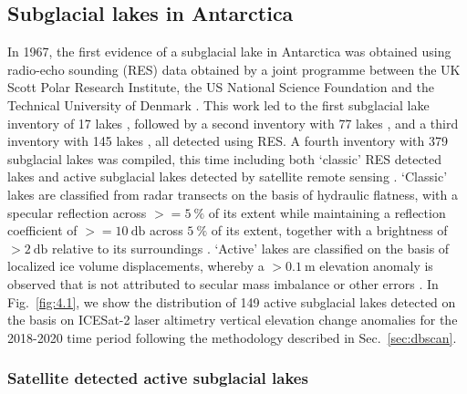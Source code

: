 \subsection{Subglacial lakes in Antarctica}

In 1967, the first evidence of a subglacial lake in Antarctica was obtained using radio-echo sounding (\gls{RES}) data obtained by a joint programme between the UK Scott Polar Research Institute, the US National Science Foundation and the Technical University of Denmark \citep{RobinInterpretationRadioEcho1969}.
This work led to the first subglacial lake inventory of 17 lakes \citep{OswaldLakesAntarcticIce1973}, followed by a second inventory with 77 lakes \citep{SiegertinventoryAntarcticsubglacial1996}, and a third inventory with 145 lakes \citep{SiegertrevisedinventoryAntarctic2005}, all detected using \gls{RES}.
A fourth inventory with 379 subglacial lakes was compiled, this time including both `classic' \gls{RES} detected lakes and active subglacial lakes detected by satellite remote sensing \citep{WrightfourthinventoryAntarctic2012}.
`Classic' lakes are classified from radar transects on the basis of hydraulic flatness, with a specular reflection across $>= \SI{5}{\percent}$ of its extent while maintaining a reflection coefficient of $>= \SI{10}{\decibel}$ across $\SI{5}{\percent}$ of its extent, together with a brightness of $> \SI{2}{\decibel}$ relative to its surroundings \citep{CarterRadarbasedsubglaciallake2007}.
`Active' lakes are classified on the basis of localized ice volume displacements, whereby a $> \SI{0.1}{\metre}$ elevation anomaly is observed that is not attributed to secular mass imbalance or other errors \citep[see][]{Smithinventoryactivesubglacial2009,SiegfriedThirteenyearssubglacial2018}.
In Fig.~\ref{fig:4.1}, we show the distribution of 149 active subglacial lakes detected on the basis on ICESat-2 laser altimetry vertical elevation change anomalies for the 2018-2020 time period following the methodology described in Sec.~\ref{sec:dbscan}.

\subsubsection{Satellite detected active subglacial lakes}

